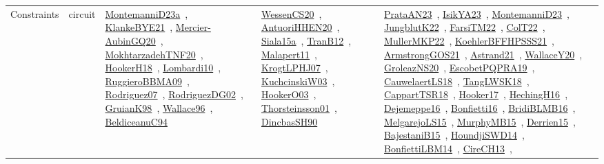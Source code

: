 {\begin{longtable}{lp{3cm}>{\raggedright\arraybackslash}p{6cm}>{\raggedright\arraybackslash}p{6cm}>{\raggedright\arraybackslash}p{8cm}}
Constraints & circuit & \href{works/MontemanniD23a.pdf}{MontemanniD23a}~\cite{MontemanniD23a}, \href{works/KlankeBYE21.pdf}{KlankeBYE21}~\cite{KlankeBYE21}, \href{works/Mercier-AubinGQ20.pdf}{Mercier-AubinGQ20}~\cite{Mercier-AubinGQ20}, \href{works/MokhtarzadehTNF20.pdf}{MokhtarzadehTNF20}~\cite{MokhtarzadehTNF20}, \href{works/HookerH18.pdf}{HookerH18}~\cite{HookerH18}, \href{works/Lombardi10.pdf}{Lombardi10}~\cite{Lombardi10}, \href{works/RuggieroBBMA09.pdf}{RuggieroBBMA09}~\cite{RuggieroBBMA09}, \href{works/Rodriguez07.pdf}{Rodriguez07}~\cite{Rodriguez07}, \href{works/RodriguezDG02.pdf}{RodriguezDG02}~\cite{RodriguezDG02}, \href{works/GruianK98.pdf}{GruianK98}~\cite{GruianK98}, \href{works/Wallace96.pdf}{Wallace96}~\cite{Wallace96}, \href{works/BeldiceanuC94.pdf}{BeldiceanuC94}~\cite{BeldiceanuC94} & \href{works/WessenCS20.pdf}{WessenCS20}~\cite{WessenCS20}, \href{works/AntuoriHHEN20.pdf}{AntuoriHHEN20}~\cite{AntuoriHHEN20}, \href{works/Siala15a.pdf}{Siala15a}~\cite{Siala15a}, \href{works/TranB12.pdf}{TranB12}~\cite{TranB12}, \href{works/Malapert11.pdf}{Malapert11}~\cite{Malapert11}, \href{works/KrogtLPHJ07.pdf}{KrogtLPHJ07}~\cite{KrogtLPHJ07}, \href{works/KuchcinskiW03.pdf}{KuchcinskiW03}~\cite{KuchcinskiW03}, \href{works/HookerO03.pdf}{HookerO03}~\cite{HookerO03}, \href{works/Thorsteinsson01.pdf}{Thorsteinsson01}~\cite{Thorsteinsson01}, \href{works/DincbasSH90.pdf}{DincbasSH90}~\cite{DincbasSH90} & \href{works/PrataAN23.pdf}{PrataAN23}~\cite{PrataAN23}, \href{works/IsikYA23.pdf}{IsikYA23}~\cite{IsikYA23}, \href{works/MontemanniD23.pdf}{MontemanniD23}~\cite{MontemanniD23}, \href{works/JungblutK22.pdf}{JungblutK22}~\cite{JungblutK22}, \href{works/FarsiTM22.pdf}{FarsiTM22}~\cite{FarsiTM22}, \href{works/ColT22.pdf}{ColT22}~\cite{ColT22}, \href{works/MullerMKP22.pdf}{MullerMKP22}~\cite{MullerMKP22}, \href{works/KoehlerBFFHPSSS21.pdf}{KoehlerBFFHPSSS21}~\cite{KoehlerBFFHPSSS21}, \href{works/ArmstrongGOS21.pdf}{ArmstrongGOS21}~\cite{ArmstrongGOS21}, \href{works/Astrand21.pdf}{Astrand21}~\cite{Astrand21}, \href{works/WallaceY20.pdf}{WallaceY20}~\cite{WallaceY20}, \href{works/GroleazNS20.pdf}{GroleazNS20}~\cite{GroleazNS20}, \href{works/EscobetPQPRA19.pdf}{EscobetPQPRA19}~\cite{EscobetPQPRA19}, \href{works/CauwelaertLS18.pdf}{CauwelaertLS18}~\cite{CauwelaertLS18}, \href{works/TangLWSK18.pdf}{TangLWSK18}~\cite{TangLWSK18}, \href{works/CappartTSR18.pdf}{CappartTSR18}~\cite{CappartTSR18}, \href{works/Hooker17.pdf}{Hooker17}~\cite{Hooker17}, \href{works/HechingH16.pdf}{HechingH16}~\cite{HechingH16}, \href{works/Dejemeppe16.pdf}{Dejemeppe16}~\cite{Dejemeppe16}, \href{works/Bonfietti16.pdf}{Bonfietti16}~\cite{Bonfietti16}, \href{works/BridiBLMB16.pdf}{BridiBLMB16}~\cite{BridiBLMB16}, \href{works/MelgarejoLS15.pdf}{MelgarejoLS15}~\cite{MelgarejoLS15}, \href{works/MurphyMB15.pdf}{MurphyMB15}~\cite{MurphyMB15}, \href{works/Derrien15.pdf}{Derrien15}~\cite{Derrien15}, \href{works/BajestaniB15.pdf}{BajestaniB15}~\cite{BajestaniB15}, \href{works/HoundjiSWD14.pdf}{HoundjiSWD14}~\cite{HoundjiSWD14}, \href{works/BonfiettiLBM14.pdf}{BonfiettiLBM14}~\cite{BonfiettiLBM14}, \href{works/CireCH13.pdf}{CireCH13}~\cite{CireCH13}, 
\end{longtable}}
